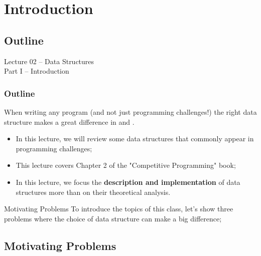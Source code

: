 \section{Introduction}
\subsection{Outline}

\begin{frame}
  \begin{center}
    {\large Lecture 02 -- Data Structures\\Part I -- Introduction}\\
  \end{center}
\end{frame}

\begin{frame}
  \frametitle{Outline}

  When writing any program (and not just programming challenges!) the right data structure makes a great difference in  and .\bigskip

  \begin{itemize}
    \item In this lecture, we will review some data structures that commonly appear in programming challenges;\medskip

    \item This lecture covers Chapter 2 of the "Competitive Programming" book;\medskip

    \item In this lecture, we focus the {\bf description and implementation} of data structures more than on their theoretical analysis.
  \end{itemize}

  \begin{block}{Motivating Problems}
    To introduce the topics of this class, let's show three problems where the choice of data structure can make a big difference;
  \end{block}
\end{frame}

\subsection{Motivating Problems}


